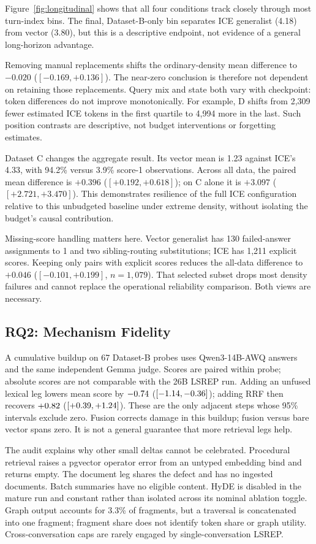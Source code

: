 \documentclass[11pt]{article}
\begin{document}
Figure~\ref{fig:longitudinal} shows that all four conditions track closely through most turn-index bins. The final, Dataset-B-only bin separates ICE generalist (4.18) from vector (3.80), but this is a descriptive endpoint, not evidence of a general long-horizon advantage.

Removing manual replacements shifts the ordinary-density mean difference to $-0.020$ ($[-0.169,+0.136]$). The near-zero conclusion is therefore not dependent on retaining those replacements. Query mix and state both vary with checkpoint: token differences do not improve monotonically. For example, D shifts from 2,309 fewer estimated ICE tokens in the first quartile to 4,994 more in the last. Such position contrasts are descriptive, not budget interventions or forgetting estimates.

Dataset C changes the aggregate result. Its vector mean is 1.23 against ICE's 4.33, with 94.2\% versus 3.9\% score-1 observations. Across all data, the paired mean difference is $+0.396$ ($[+0.192,+0.618]$); on C alone it is $+3.097$ ($[+2.721,+3.470]$). This demonstrates resilience of the full ICE configuration relative to this unbudgeted baseline under extreme density, without isolating the budget's causal contribution.

Missing-score handling matters here. Vector generalist has 130 failed-answer assignments to 1 and two sibling-routing substitutions; ICE has 1,211 explicit scores. Keeping only pairs with explicit scores reduces the all-data difference to $+0.046$ ($[-0.101,+0.199]$, $n=1,079$). That selected subset drops most density failures and cannot replace the operational reliability comparison. Both views are necessary.

\subsection{RQ2: Mechanism Fidelity}
A cumulative buildup on 67 Dataset-B probes uses Qwen3-14B-AWQ answers and the same independent Gemma judge. Scores are paired within probe; absolute scores are not comparable with the 26B LSREP run. Adding an unfused lexical leg lowers mean score by $-0.74$ ($[-1.14,-0.36]$); adding RRF then recovers $+0.82$ ($[+0.39,+1.24]$). These are the only adjacent steps whose 95\% intervals exclude zero. Fusion corrects damage in this buildup; fusion versus bare vector spans zero. It is not a general guarantee that more retrieval legs help.

The audit explains why other small deltas cannot be celebrated. Procedural retrieval raises a pgvector operator error from an untyped embedding bind and returns empty. The document leg shares the defect and has no ingested documents. Batch summaries have no eligible content. HyDE is disabled in the mature run and constant rather than isolated across its nominal ablation toggle. Graph output accounts for 3.3\% of fragments, but a traversal is concatenated into one fragment; fragment share does not identify token share or graph utility. Cross-conversation caps are rarely engaged by single-conversation LSREP.
\end{document}
